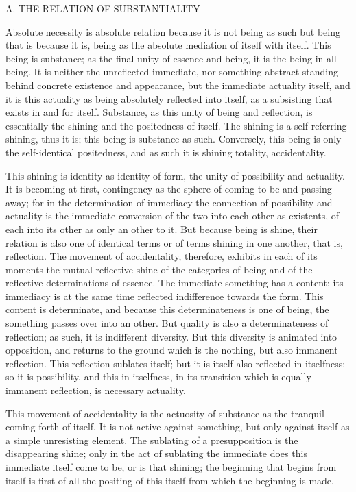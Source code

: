 
A. THE RELATION OF SUBSTANTIALITY

Absolute necessity is absolute relation
because it is not being as such
but being that is because it is,
being as the absolute mediation
of itself with itself.
This being is substance;
as the final unity of essence and being,
it is the being in all being.
It is neither the unreflected immediate,
nor something abstract standing behind
concrete existence and appearance,
but the immediate actuality itself,
and it is this actuality
as being absolutely reflected into itself,
as a subsisting that exists in and for itself.
Substance, as this unity of being and reflection,
is essentially the shining and the positedness of itself.
The shining is a self-referring shining, thus it is;
this being is substance as such.
Conversely, this being is only the self-identical positedness,
and as such it is shining totality, accidentality.

This shining is identity as identity of form,
the unity of possibility and actuality.
It is becoming at first, contingency as the sphere
of coming-to-be and passing-away;
for in the determination of immediacy
the connection of possibility and actuality is
the immediate conversion of the two
into each other as existents,
of each into its other as only an other to it.
But because being is shine,
their relation is also one of identical terms
or of terms shining in one another, that is, reflection.
The movement of accidentality, therefore,
exhibits in each of its moments the mutual
reflective shine of the categories of being
and of the reflective determinations of essence.
The immediate something has a content;
its immediacy is at the same time
reflected indifference towards the form.
This content is determinate,
and because this determinateness is one of being,
the something passes over into an other.
But quality is also a determinateness of reflection;
as such, it is indifferent diversity.
But this diversity is animated into opposition,
and returns to the ground which is the nothing,
but also immanent reflection.
This reflection sublates itself;
but it is itself also reflected in-itselfness:
so it is possibility, and this in-itselfness,
in its transition which is equally immanent reflection,
is necessary actuality.

This movement of accidentality is the actuosity of substance
as the tranquil coming forth of itself.
It is not active against something,
but only against itself as a simple unresisting element.
The sublating of a presupposition is the disappearing shine;
only in the act of sublating the immediate does this
immediate itself come to be, or is that shining;
the beginning that begins from itself is first of all
the positing of this itself from which the beginning is made.

